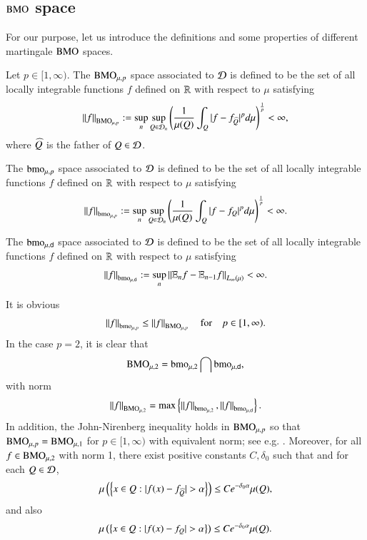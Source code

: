 \documentclass[leqno]{amsart}
\begin{document}
\subsection{${\rm BMO}$ space}
For our purpose, let us introduce the definitions and some properties of different martingale ${\rm BMO}$ spaces.

\begin{definition}
Let $p\in[1,\infty)$. The  ${\rm BMO}_{\mu,p}$ space associated to ${\mathcal D}$ is defined to be the set of all locally integrable functions $f$ defined on ${\mathbb R}$ with respect to $\mu$ satisfying
\begin{align*}
\left\| f \right\|_{{\rm BMO}_{\mu,p}}:=
\sup_{n}\sup_{Q\in{\mathcal D}_{n}}\left(\frac{1}{\mu(Q)}\int_{Q}|f-f_{\widehat{Q}}|^{p}d\mu\right)^{\frac{1}{p}}
<\infty,
\end{align*}
where $\widehat{Q}$ is the father of $Q\in{\mathcal D}$.

The ${\rm bmo}_{\mu,p}$ space associated to ${\mathcal D}$ is defined to be the set of all locally integrable functions $f$ defined on ${\mathbb R}$ with respect to $\mu$ satisfying
\begin{align*}
\left\| f \right\|_{{\rm bmo}_{\mu,p}}:=
\sup_{n}\sup_{Q\in{\mathcal D}_{n}}\left(\frac{1}{\mu(Q)}\int_{Q}|f-f_{Q}|^{p}d\mu\right)^{\frac{1}{p}}<\infty.
\end{align*}

The ${\rm bmo}_{\mu,\mathsf{d}}$ space associated to ${\mathcal D}$ is defined to be the set of all locally integrable functions $f$ defined on ${\mathbb R}$ with respect to $\mu$ satisfying
\begin{align*}
\left\| f \right\|_{{\rm bmo}_{\mu,\mathsf{d}}}:=\sup_{n}\left\| \mathbb E_{n}f-\mathbb E_{n-1}f \right\|_{L_{\infty}(\mu)}<\infty.
\end{align*}
\end{definition}
It is obvious $$\left\| f \right\|_{{\rm bmo}_{\mu,p}}\leq\left\| f \right\|_{{\rm BMO}_{\mu,p}}\quad\mbox{for}\quad p\in[1,\infty).$$
In the case $p=2$, it is clear that 
\begin{align}\label{BMO intersection space}
{\rm BMO}_{\mu,2}={\rm bmo}_{\mu,2}\bigcap{\rm bmo}_{\mu,\mathsf{d}},
\end{align}
with norm $$\left\| f \right\|_{{\rm BMO}_{\mu,2}}=\max\left\{ \left\| f \right\|_{{\rm bmo}_{\mu,2}},\left\| f \right\|_{{\rm bmo}_{\mu,\mathsf{d}}} \right\}.$$
In addition, the John-Nirenberg inequality holds in ${\rm BMO}_{\mu,p}$ so that ${\rm BMO}_{\mu,p}={\rm BMO}_{\mu,1}$ for $p\in[1,\infty)$ with equivalent norm; see e.g. \cite[Chapter 4]{Lo1993}. 
Moreover,  for all $f\in{\rm BMO}_{\mu,2}$ with norm 1, there exist positive constants $C,\delta_{0}$ such that and for each $Q\in{\mathcal D}$,
\begin{align}\label{John-Nirenberg inequality}
\mu\left(\set{x\in Q:|f(x)-f_{\wh{Q}}|>\alpha}\right)\leq Ce^{-\delta_{0}\alpha}\mu(Q),
\end{align}
and also
\begin{align*}
\mu\left(\set{x\in Q:|f(x)-f_{Q}|>\alpha}\right)\leq Ce^{-\delta_{0}\alpha}\mu(Q).
\end{align*}
\end{document}
